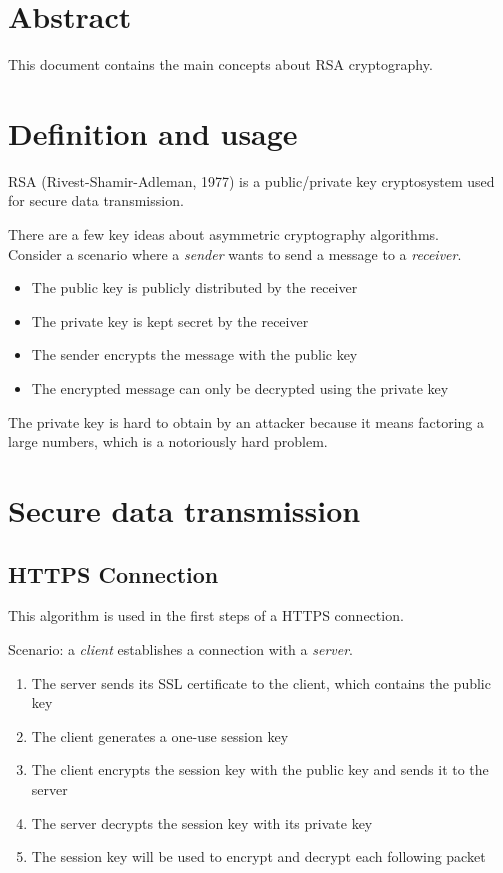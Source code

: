 \documentclass[a4paper]{article}
\author{Paolo Bettelini}
\date{}
\begin{document}
\maketitle

\section*{Abstract}
This document contains the main concepts about RSA cryptography.

\pagebreak

\tableofcontents
\pagebreak

\section{Definition and usage}


RSA (Rivest-Shamir-Adleman, 1977) is a public/private key cryptosystem used for secure data transmission.

There are a few key ideas about asymmetric cryptography algorithms.
\\
Consider a scenario where a \textit{sender} wants to send a message to a \textit{receiver}.
\begin{itemize}
    \item The public key is publicly distributed by the receiver
    \item The private key is kept secret by the receiver
    \item The sender encrypts the message with the public key
    \item The encrypted message can only be decrypted using the private key
\end{itemize}

The private key is hard to obtain by an attacker because it means factoring a large numbers, which is a notoriously hard problem.

\section{Secure data transmission}

\subsection{HTTPS Connection}

This algorithm is used in the first steps of a HTTPS connection.

Scenario: a \textit{client} establishes a connection with a \textit{server}.
\begin{enumerate}
    \item The server sends its SSL certificate to the client, which contains the public key
    \item The client generates a one-use session key
    \item The client encrypts the session key with the public key and sends it to the server
    \item The server decrypts the session key with its private key
    \item The session key will be used to encrypt and decrypt each following packet
\end{enumerate}
\end{document}
